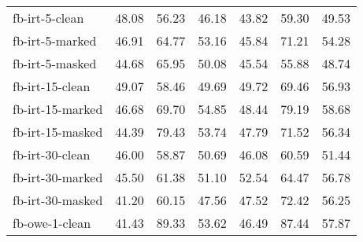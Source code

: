 \begin{tabular}{| l | r | r | r | r | r | r |}
    fb-irt-5-clean    & 48.08 & 56.23 & 46.18 & 43.82 & 59.30 & 49.53 \\
    fb-irt-5-marked   & 46.91 & 64.77 & 53.16 & 45.84 & 71.21 & 54.28 \\
    fb-irt-5-masked   & 44.68 & 65.95 & 50.08 & 45.54 & 55.88 & 48.74 \\ \hline
    fb-irt-15-clean   & 49.07 & 58.46 & 49.69 & 49.72 & 69.46 & 56.93 \\
    fb-irt-15-marked  & 46.68 & 69.70 & 54.85 & 48.44 & 79.19 & 58.68 \\
    fb-irt-15-masked  & 44.39 & 79.43 & 53.74 & 47.79 & 71.52 & 56.34 \\ \hline
    fb-irt-30-clean   & 46.00 & 58.87 & 50.69 & 46.08 & 60.59 & 51.44 \\
    fb-irt-30-marked  & 45.50 & 61.38 & 51.10 & 52.54 & 64.47 & 56.78 \\
    fb-irt-30-masked  & 41.20 & 60.15 & 47.56 & 47.52 & 72.42 & 56.25 \\ \hline
    fb-owe-1-clean    & 41.43 & 89.33 & 53.62 & 46.49 & 87.44 & 57.87 \\ \hline

\end{tabular}

